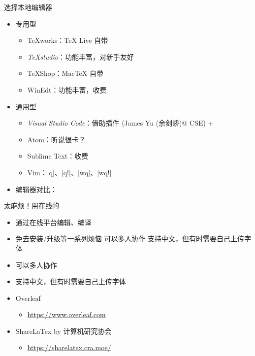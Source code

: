 \begin{frame}[fragile]{选择本地编辑器}
  \begin{itemize}
    \item<+-> 专用型
  
      \begin{itemize}
        \item TeXworks：\TeX{} Live 自带 \faWindows{} \faApple{} \faLinux{}
        \item \emph{TeXstudio}：功能丰富，对新手友好 \faWindows{} \faApple{} \faLinux{}
        \item TeXShop：Mac\TeX{} 自带 \faApple{}
        \item WinEdt：功能丰富，收费 \faWindows{}
      \end{itemize}
  
    \item<+-> 通用型
  
      \begin{itemize}
        \item \emph{Visual Studio Code}：借助插件  (James Yu (余剑峤)@ CSE) + 
        \item Atom：听说很卡？
        \item Sublime Text：收费
        \item Vim：|q|、|q!|、|wq|、|wq!|
      \end{itemize}

    \item<+-> 编辑器对比：
  \end{itemize}
\end{frame}


\begin{frame}[fragile]{太麻烦！用在线的}

    \begin{itemize}
        \item 通过在线平台编辑、编译
        \item 免去安装/升级等一系列烦恼 可以多人协作 支持中文，但有时需要自己上传字体
        \item 可以多人协作
        \item 支持中文，但有时需要自己上传字体
    \end{itemize}

    \begin{itemize}
      \item Overleaf
      \begin{itemize}
          \item \url{https://www.overleaf.com}
      \end{itemize}
      \item ShareLaTex by 计算机研究协会
      \begin{itemize}
        \item \url{https://sharelatex.cra.moe/}
    \end{itemize}
      \end{itemize}
  \end{frame}


